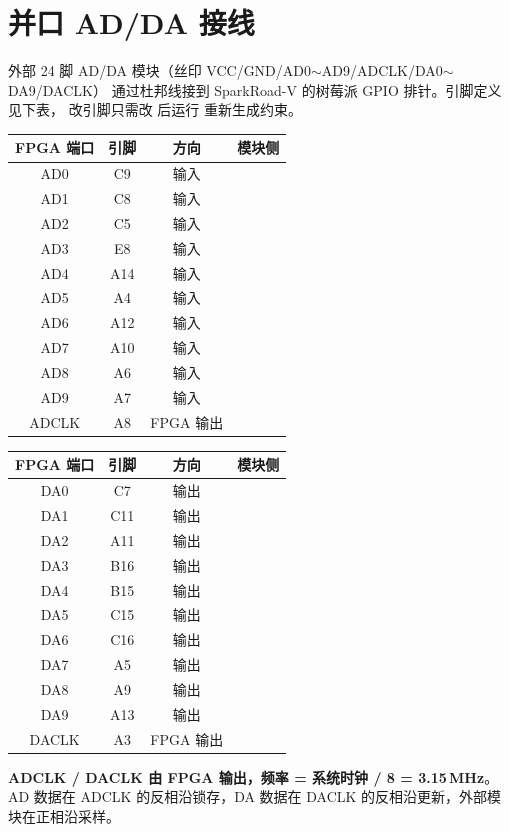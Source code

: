 \documentclass[UTF8,a4paper,11pt]{ctexart}
\begin{document}
\section{并口 AD/DA 接线}
\label{sec:adda}

外部 24 脚 AD/DA 模块（丝印 VCC/GND/AD0$\sim$AD9/ADCLK/DA0$\sim$DA9/DACLK）
通过杜邦线接到 SparkRoad-V 的树莓派 GPIO 排针。引脚定义见下表，
改引脚只需改  后运行
 重新生成约束。

\begin{center}
\small
\begin{tabular}{cccc}
\toprule
FPGA 端口 & 引脚 & 方向 & 模块侧\\
\midrule
AD0 & C9 & 输入\\
AD1 & C8 & 输入\\
AD2 & C5 & 输入\\
AD3 & E8 & 输入\\
AD4 & A14 & 输入\\
AD5 & A4 & 输入\\
AD6 & A12 & 输入\\
AD7 & A10 & 输入\\
AD8 & A6 & 输入\\
AD9 & A7 & 输入\\
ADCLK & A8 & FPGA 输出\\
\bottomrule
\end{tabular}
\qquad
\begin{tabular}{cccc}
\toprule
FPGA 端口 & 引脚 & 方向 & 模块侧\\
\midrule
DA0 & C7 & 输出\\
DA1 & C11 & 输出\\
DA2 & A11 & 输出\\
DA3 & B16 & 输出\\
DA4 & B15 & 输出\\
DA5 & C15 & 输出\\
DA6 & C16 & 输出\\
DA7 & A5 & 输出\\
DA8 & A9 & 输出\\
DA9 & A13 & 输出\\
DACLK & A3 & FPGA 输出\\
\bottomrule
\end{tabular}
\end{center}

\begin{tipbox}
\textbf{ADCLK / DACLK 由 FPGA 输出，频率 = 系统时钟 / 8 = 3.15\,MHz}。
AD 数据在 ADCLK 的反相沿锁存，DA 数据在 DACLK 的反相沿更新，外部模块在正相沿采样。
\end{tipbox}
\end{document}
